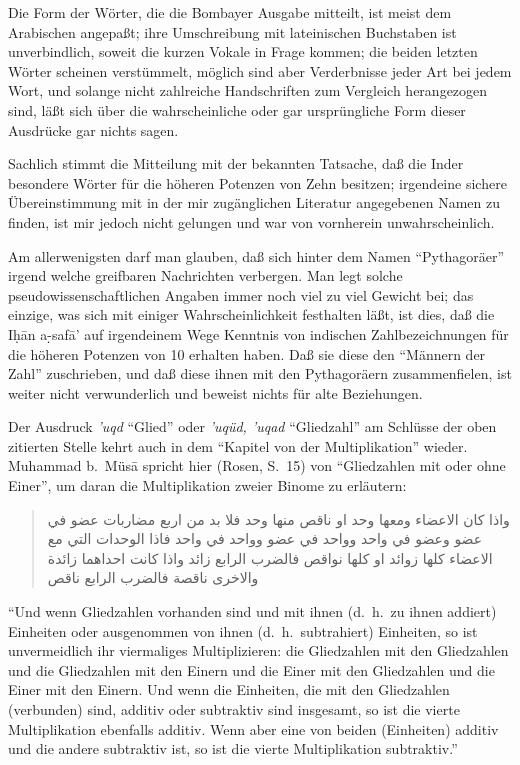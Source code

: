 \documentclass[11pt,a4paper]{article}
\newcommand{\RL}[1]{\beginR#1\endR}
\newcommand{\s}[1]{\d{#1}}     %
\newcommand{\hw}{\d{h}}       %
\newcommand{\ar}[1]{{\arabicfont\RL{#1}}}
\newcommand{\enquote}[1]{``#1''}
\begin{document}
Die Form der W\"orter, die die Bombayer Ausgabe mitteilt, ist meist dem Arabischen angepa\ss{}t; ihre Umschreibung mit lateinischen Buchstaben ist unverbindlich, soweit die kurzen Vokale in Frage kommen; die beiden letzten W\"orter scheinen verst\"ummelt, m\"oglich sind aber Verderbnisse jeder Art bei jedem Wort, und solange nicht zahlreiche Handschriften zum Vergleich herangezogen sind, l\"a\ss{}t sich \"uber die wahrscheinliche oder gar urspr\"ungliche Form dieser Ausdr\"ucke gar nichts sagen.

Sachlich stimmt die Mitteilung mit der bekannten Tatsache, da\ss{} die Inder besondere W\"orter f\"ur die h\"oheren Potenzen von Zehn besitzen; irgendeine sichere \"Ubereinstimmung mit in der mir zug\"anglichen Literatur angegebenen Namen zu finden, ist mir jedoch nicht gelungen und war von vornherein unwahrscheinlich.

Am allerwenigsten darf man glauben, da\ss{} sich hinter dem Namen \enquote{Pythagor\"aer} irgend welche greifbaren Nachrichten verbergen. Man legt solche pseudowissenschaftlichen Angaben immer noch viel zu viel Gewicht bei; das einzige, was sich mit einiger Wahrscheinlichkeit festhalten l\"a\ss{}t, ist dies, da\ss{} die I\hw{}\=an a\s-s{}af\=a' auf irgendeinem Wege Kenntnis von indischen Zahlbezeichnungen f\"ur die h\"oheren Potenzen von 10 erhalten haben. Da\ss{} sie diese den \enquote{M\"annern der Zahl} zuschrieben, und da\ss{} diese ihnen mit den Pythagor\"aern zusammenfielen, ist weiter nicht verwunderlich und beweist nichts f\"ur alte Beziehungen.

Der Ausdruck \textit{'uqd} \enquote{Glied} oder \textit{'uq\"ud, 'uqad} \enquote{Gliedzahl} am Schl\"usse der oben zitierten Stelle kehrt auch in dem \enquote{Kapitel von der Multiplikation} wieder. Muhammad b.\ M\"us\=a spricht hier (Rosen, S.\ 15) von \enquote{Gliedzahlen mit oder ohne Einer}, um daran die Multiplikation zweier Binome zu erl\"autern:

\begin{quote}
\ar{واذا كان الاعضاء ومعها وحد او ناقص منها وحد فلا بد من اربع مضاربات عضو في عضو وعضو في واحد وواحد في عضو وواحد في واحد فاذا الوحدات التي مع الاعضاء كلها زوائد او كلها نواقص فالضرب الرابع زائد واذا كانت احداهما زائدة والاخرى ناقصة فالضرب الرابع ناقص}
\end{quote}

\enquote{Und wenn Gliedzahlen vorhanden sind und mit ihnen (d.\ h.\ zu ihnen addiert) Einheiten oder ausgenommen von ihnen (d.\ h.\ subtrahiert) Einheiten, so ist unvermeidlich ihr viermaliges Multiplizieren: die Gliedzahlen mit den Gliedzahlen und die Gliedzahlen mit den Einern und die Einer mit den Gliedzahlen und die Einer mit den Einern. Und wenn die Einheiten, die mit den Gliedzahlen (verbunden) sind, additiv oder subtraktiv sind insgesamt, so ist die vierte Multiplikation ebenfalls additiv. Wenn aber eine von beiden (Einheiten) additiv und die andere subtraktiv ist, so ist die vierte Multiplikation subtraktiv.}
\end{document}

